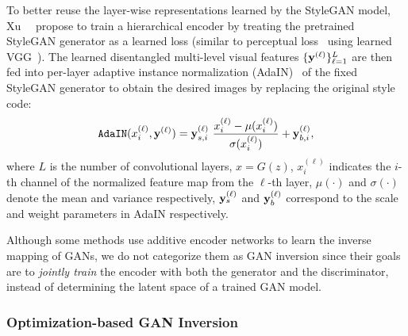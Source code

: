To better reuse the layer-wise representations learned by the StyleGAN model, Xu~\etal~\cite{xu2021ghfeat} propose to train a hierarchical encoder by treating the pretrained StyleGAN generator as a learned loss (similar to perceptual loss~\cite{johnson2016perceptual} using learned VGG~\cite{simonyan2014very}). 
The learned disentangled multi-level visual features $\{\mathbf{y}^{(\ell)}\}^L_{\ell=1}$  are then fed into per-layer adaptive instance normalization (AdaIN)~\cite{huang2017adain} of the fixed StyleGAN generator to obtain the desired images by replacing the original style code:
\begin{equation}
\mathtt{AdaIN}({x}_i^{(\ell)}, \y^{(\ell)}) = \y_{s,i}^{(\ell)}\ \frac{{x}_i^{(\ell)} - \mu({x}_i^{(\ell)})}{\sigma({x}_i^{(\ell)})} + \y_{b,i}^{(\ell)},
\label{eq:adain}  
\end{equation}
where $L$ is the number of convolutional layers, ${x}=G(z)$, ${x}_i^{(\ell)}$ indicates the $i$-th channel of the normalized feature map from the $\ell$-th layer, $\mu(\cdot)$ and $\sigma(\cdot)$ denote the mean and variance respectively, $\mathbf{y}_s^{(\ell)}$ and $\mathbf{y}_b^{(\ell)}$ correspond to the scale and weight parameters in AdaIN respectively.

Although some methods\cite{donahue2016adversarial,dumoulin2016adversarially} use additive encoder networks to learn the inverse mapping of GANs, we do not categorize them as GAN inversion since their goals are to \emph{jointly train} the encoder with both the generator and the discriminator, instead of determining the latent space of a trained GAN model.

\subsubsection{Optimization-based GAN Inversion}
\label{sec:optimization-based}

